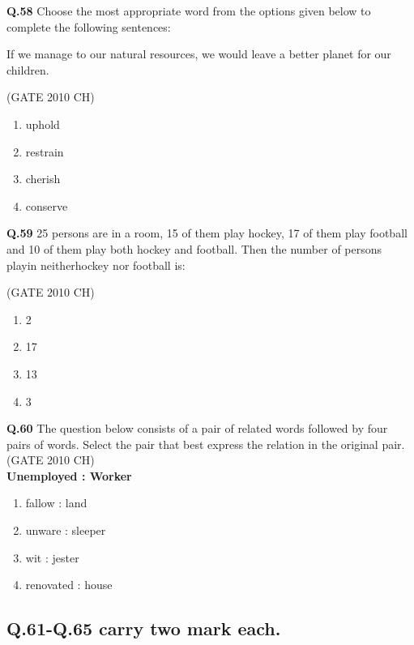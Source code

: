 \documentclass[journal,12pt,onecolumn]{exam}
\theoremstyle{remark}
\begin{document}
\noindent
\textbf{Q.58}
 Choose the most appropriate word from the options given below to complete the following sentences:

  If we manage to \makebox[3cm]{\hrulefill} our natural resources, we would leave a better planet for our children.

\hfill{(GATE 2010 CH)}\\

\begin{enumerate}
    \item uphold
    \item restrain
    \item cherish
    \item conserve
\end{enumerate}

\noindent
\textbf{Q.59}
 25 persons are in a room, 15 of them play hockey, 17 of them play football and 10 of them play both hockey and football. Then the number of persons playin neitherhockey nor football is:

 \hfill{(GATE 2010 CH)}\\

 \begin{enumerate}
     \item 2
     \item 17
     \item 13
     \item 3
     
 \end{enumerate}

\noindent
\textbf{Q.60}
  The question below consists of a pair of related words followed by four pairs of words. Select the pair that best express the relation in the original pair.\\
 
  \hfill{(GATE 2010 CH)}\\
  
  \textbf{Unemployed : Worker}

\begin{enumerate}
    \item fallow : land
    \item unware : sleeper
    \item wit : jester
    \item renovated : house
\end{enumerate}

\subsection{Q.61-Q.65 carry two mark each.}
\end{document}
